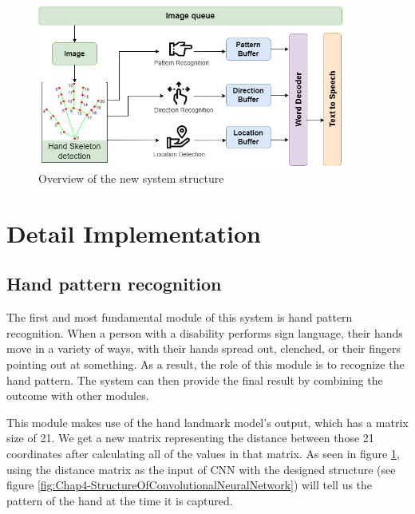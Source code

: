 \begin{figure}[H]
	\centering
	\includegraphics[width=0.9\textwidth]{img/Chap4/OverviewOfTheSystemModules-New.png}
	\caption{Overview of the new system structure}
	\label{fig:Chap4-OverviewOfTheSystemModules-New}
\end{figure}

\section{Detail Implementation}\label{sec:DetailImplementation}

\subsection{Hand pattern recognition}

The first and most fundamental module of this system is hand pattern recognition. When a person with a disability performs sign language, their hands move in a variety of ways, with their hands spread out, clenched, or their fingers pointing out at something. As a result, the role of this module is to recognize the hand pattern. The system can then provide the final result by combining the outcome with other modules.

This module makes use of the hand landmark model's output, which has a matrix size of 21. We get a new matrix representing the distance between those 21 coordinates after calculating all of the values in that matrix. As seen in figure \ref{fig:Chap4-OverviewOfTheSystemModules-New}, using the distance matrix as the input of CNN with the designed structure (see figure \ref{fig:Chap4-StructureOfConvolutionalNeuralNetwork}) will tell us the pattern of the hand at the time it is captured.

